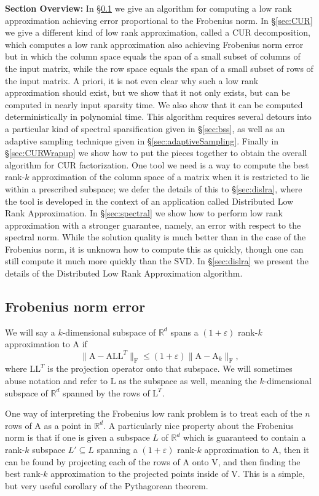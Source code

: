 \documentclass[11pt]{article}
\newcommand{\FNorm }[1]{\mbox{}\|#1\|_\mathrm{F}  }
\newcommand{\mat}[1]{{\ensuremath{\bm{\mathrm{#1}}}}}
\def\matA{\mat{A}}
\def\matL{\mat{L}}
\def\matV{\mat{V}}
\newcommand{\eps}{\varepsilon}
\begin{document}
{\bf Section Overview:} In \S\ref{sec:frobenius} we give an algorithm for computing a low rank approximation achieving error proportional to the Frobenius norm. In \S\ref{sec:CUR} we give a different kind of low rank approximation, called a CUR decomposition, which computes a low rank approximation also achieving Frobenius norm error but in which the column space equals the span of a small subset of columns of the input matrix, while the row space equals the span of a small subset of rows of the input matrix. A priori, it is not even clear why such a low rank approximation should exist, but we show that it not only exists, but can be computed in nearly input sparsity time. We also show that it can be computed deterministically in polynomial time. This algorithm requires several detours into a particular kind of spectral sparsification given in \S\ref{sec:bss}, as well as an adaptive sampling technique given in \S\ref{sec:adaptiveSampling}. Finally in \S\ref{sec:CURWrapup} we show how to put the pieces together to obtain the overall algorithm for CUR factorization. One tool we need is a way to compute the best rank-$k$ approximation of the column space of a matrix when it is restricted to lie within a prescribed subspace; we defer the details of this to \S\ref{sec:dislra}, where the tool is developed in the context of an application called Distributed Low Rank Approximation. In \S\ref{sec:spectral} we show how to perform low rank approximation with a stronger guarantee, namely, an error with respect to the spectral norm. While the solution quality is much better than in the case of the Frobenius norm, it is unknown how to compute this as quickly, though one can still compute it much more quickly than the SVD. In \S\ref{sec:dislra} we present the details of the Distributed Low Rank Approximation algorithm.

\subsection{Frobenius norm error}\label{sec:frobenius}
We will say a $k$-dimensional subspace of $\mathbb{R}^d$ spans a 
$(1+\eps)$ rank-$k$ approximation to $\matA$ if 
$$\FNorm{\matA-\matA\matL\matL^T} \leq (1+\eps) \FNorm{\matA-\matA_k},$$
where $\matL\matL^T$ is the projection operator onto that subspace. We will
sometimes abuse notation and refer to $\matL$ as the subspace as well,
meaning the $k$-dimensional subspace of $\mathbb{R}^d$ spanned
by the rows of $\matL^T$. 

One way of interpreting the Frobenius low rank problem is to treat each
of the $n$ rows of $\matA$ as a point in $\mathbb{R}^d$. A 
particularly nice property about the Frobenius norm is that if one is given
a subspace $L$ of $\mathbb{R}^d$ which is guaranteed to contain a
rank-$k$ subspace $L' \subseteq L$ spanning a $(1+\eps)$ rank-$k$
approximation to $\matA$, then it can be found by projecting each of the
rows of $\matA$ onto $\matV$, and then finding the best rank-$k$ approximation
to the projected points inside of $\matV$. This is a simple, but very useful
corollary of the Pythagorean theorem.
\end{document}
